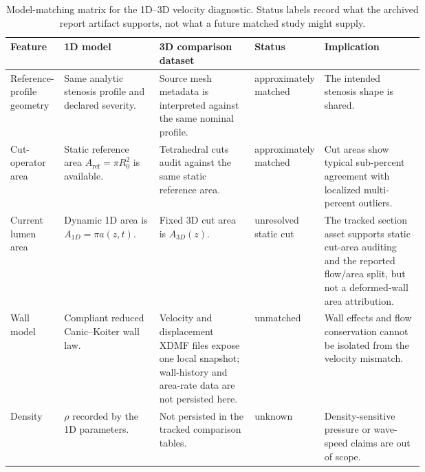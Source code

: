 \begin{landscape}
\begin{table}[!htb]
    \centering
    \scriptsize
    \caption{Model-matching matrix for the 1D--3D velocity diagnostic. Status
    labels record what the archived report artifact supports, not what a future
    matched study might supply.}
    \label{tab:t1-model-matching-matrix}
    \begin{tabularx}{\linewidth}{@{}
        >{\raggedright\arraybackslash}p{0.13\linewidth}
        >{\raggedright\arraybackslash}p{0.23\linewidth}
        >{\raggedright\arraybackslash}p{0.23\linewidth}
        >{\raggedright\arraybackslash}p{0.11\linewidth}
        >{\raggedright\arraybackslash}X@{}}
        \toprule
        \textbf{Feature}
            & \textbf{1D model}
            & \textbf{3D comparison dataset}
            & \textbf{Status}
            & \textbf{Implication} \\
        \midrule
        Reference-profile geometry
            & Same analytic stenosis profile and declared severity.
            & Source mesh metadata is interpreted against the same nominal
            profile.
            & approximately matched
            & The intended stenosis shape is shared. \\
        Cut-operator area
            & Static reference area $A_{\mathrm{ref}}=\pi R_0^2$ is available.
            & Tetrahedral cuts audit against the same static reference area.
            & approximately matched
            & Cut areas show typical sub-percent agreement with localized
            multi-percent outliers. \\
        Current lumen area
            & Dynamic 1D area is $A_{1D}=\pi a(z,t)$.
            & Fixed 3D cut area is $A_{3D}(z)$.
            & unresolved static cut
            & The tracked section asset supports static cut-area auditing and the
            reported flow/area split, but not a deformed-wall area attribution. \\
        Wall model
            & Compliant reduced Canic--Koiter wall law.
            & Velocity and displacement XDMF files expose one local snapshot;
            wall-history and area-rate data are not persisted here.
            & unmatched
            & Wall effects and flow conservation cannot be isolated from the
            velocity mismatch. \\
        Density
            & $\rho$ recorded by the 1D parameters.
            & Not persisted in the tracked comparison tables.
            & unknown
            & Density-sensitive pressure or wave-speed claims are out of scope. \\

\end{tabularx}
\end{table}
\end{landscape}

